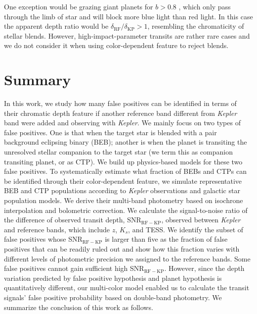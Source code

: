 \documentclass{aastex63}
\begin{document}
One exception would be grazing giant planets for $b>0.8$ \citep{Tingley2004}, which only pass through the limb of star and will block more blue light than red light. In this case the apparent depth ratio would be $\delta_\mathrm{RF}/\delta_\mathrm{KP}>1$, resembling the chromaticity of stellar blends. However, high-impact-parameter transits are rather rare cases and we do not consider it when using color-dependent feature to reject blends.


\section{Summary}
\label{sec:summary}

In this work, we study how many false positives can be identified in terms of their chromatic depth feature if another reference band different from \emph{Kepler} band were added and observing with \emph{Kepler}. We mainly focus on two types of false positives. One is that when the target star is blended with a pair background eclipsing binary (BEB); another is when the planet is transiting the unresolved stellar companion to the target star (we term this as companion transiting planet, or as CTP). We build up physics-based models for these two false positives. To systematically estimate what fraction of BEBs and CTPs can be identified through their color-dependent feature, we simulate representative BEB and CTP populations according to \emph{Kepler} observations and galactic star population models. We derive their multi-band photometry based on isochrone interpolation and bolometric correction. We calculate the signal-to-noise ratio of the difference of observed transit depth, SNR$_\mathrm{RF-KP}$, observed between \emph{Kepler} and reference bands, which include  $z$, $K_s$, and TESS. We identify the subset of false positives whose SNR$_\mathrm{RF-KP}$ is larger than five as the fraction of false positives that can be readily ruled out and show how this fraction varies with different levels of photometric precision we assigned to the reference bands. Some false positives cannot gain sufficient high SNR$_\mathrm{RF-KP}$. However, since the depth variation predicted by false positive hypothesis and planet hypothesis is quantitatively different, our multi-color model enabled us to calculate the transit signals' false positive probability based on double-band photometry. We summarize the conclusion of this work as follows.
\end{document}
